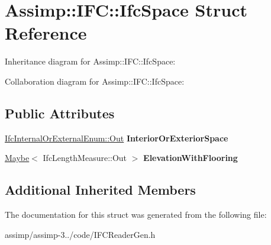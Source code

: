\hypertarget{struct_assimp_1_1_i_f_c_1_1_ifc_space}{\section{Assimp\+:\+:I\+F\+C\+:\+:Ifc\+Space Struct Reference}
\label{struct_assimp_1_1_i_f_c_1_1_ifc_space}
}


Inheritance diagram for Assimp\+:\+:I\+F\+C\+:\+:Ifc\+Space\+:


Collaboration diagram for Assimp\+:\+:I\+F\+C\+:\+:Ifc\+Space\+:
\subsection*{Public Attributes}
\begin{DoxyCompactItemize}
\item 
\hypertarget{struct_assimp_1_1_i_f_c_1_1_ifc_space_a4d8c37e138e575ff405f6b3d8bed59a1}{\hyperlink{classboost_1_1shared__ptr}{Ifc\+Internal\+Or\+External\+Enum\+::\+Out} {\bfseries Interior\+Or\+Exterior\+Space}}\label{struct_assimp_1_1_i_f_c_1_1_ifc_space_a4d8c37e138e575ff405f6b3d8bed59a1}

\item 
\hypertarget{struct_assimp_1_1_i_f_c_1_1_ifc_space_a9b008ac4e4762d8cb77914ba74f724cd}{\hyperlink{struct_assimp_1_1_s_t_e_p_1_1_maybe}{Maybe}$<$ Ifc\+Length\+Measure\+::\+Out $>$ {\bfseries Elevation\+With\+Flooring}}\label{struct_assimp_1_1_i_f_c_1_1_ifc_space_a9b008ac4e4762d8cb77914ba74f724cd}

\end{DoxyCompactItemize}
\subsection*{Additional Inherited Members}


The documentation for this struct was generated from the following file\+:\begin{DoxyCompactItemize}
\item 
assimp/assimp-\/3../code/I\+F\+C\+Reader\+Gen.\+h\end{DoxyCompactItemize}
